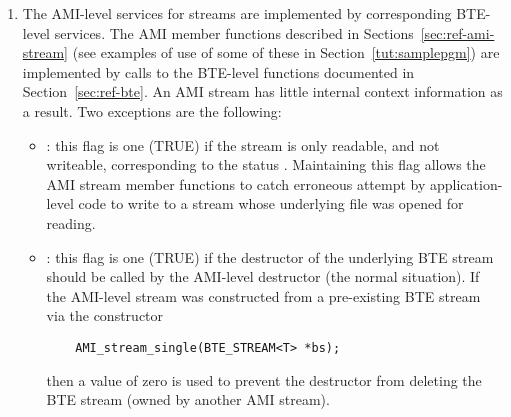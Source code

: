 \begin{itemize}
\begin{enumerate}
        \item The AMI-level services for streams are
        implemented by corresponding BTE-level services. The
        AMI member functions described in
        Sections~\ref{sec:ref-ami-stream} (see examples of
        use of some of these in Section~\ref{tut:samplepgm})
        are implemented by calls to the BTE-level functions
        documented in Section~\ref{sec:ref-bte}. An AMI
        stream has little internal context information as a
        result. Two exceptions are the following:
        \begin{itemize}
            \item {}: this flag is one (TRUE) if
            the stream is only readable, and not writeable,
            corresponding to the status
            . Maintaining this flag
            allows the AMI stream member functions to catch
            erroneous attempt by application-level code to
            write to a stream whose underlying file was
            opened for reading.
            
            \item {}: this flag is one
            (TRUE) if the destructor of the underlying BTE
            stream should be called by the AMI-level
            destructor (the normal situation). If the
            AMI-level stream was constructed from a
            pre-existing BTE stream via the constructor
\begin{verbatim}
    AMI_stream_single(BTE_STREAM<T> *bs);
\end{verbatim}
            then a  value of zero is used
            to prevent the destructor from deleting the BTE
            stream (owned by another AMI stream).
        \end{itemize}
    \end{enumerate}

\end{itemize}



